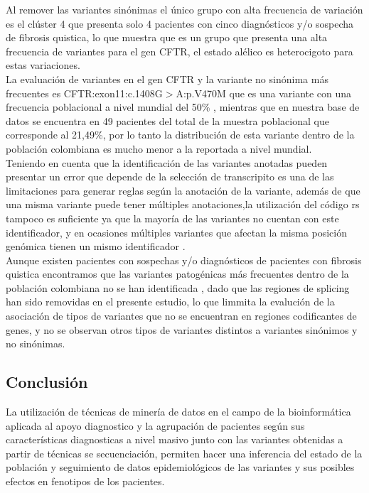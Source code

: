 Al remover las variantes sinónimas el único grupo con alta frecuencia de variación es el clúster 4 que presenta solo 4 pacientes con cinco diagnósticos y/o sospecha de fibrosis quistica, lo que muestra que es un grupo que presenta una alta frecuencia de variantes para el gen CFTR, el estado alélico es heterocigoto para estas variaciones.\\

La evaluación de variantes en el gen CFTR y la variante no sinónima más frecuentes es CFTR:exon11:c.1408G$>$A:p.V470M que es una variante con una frecuencia poblacional a nivel mundial del 50\% \cite{Zerbino2018}, mientras que en  nuestra base de datos se encuentra en 49 pacientes del total de la muestra poblacional que corresponde al 21,49\%, por lo tanto la distribución de esta variante dentro de la población colombiana es mucho menor a la reportada a nivel mundial.\\

Teniendo en cuenta que la identificación de las variantes anotadas pueden presentar un error que depende de la selección de transcripito es una de las limitaciones para generar reglas según la anotación de la variante, además de que una misma variante puede tener múltiples anotaciones,la utilización del código rs tampoco es suficiente ya que la mayoría de las variantes no cuentan con este identificador, y en ocasiones múltiples variantes que afectan la misma posición genómica tienen un mismo identificador \cite{Liu2016,McCarthy2014}. \\  

Aunque existen pacientes con sospechas y/o diagnósticos de pacientes con fibrosis quistica encontramos que las variantes patogénicas más frecuentes dentro de la población colombiana no se han identificada \cite{Vasquez2010}, dado que las regiones de splicing han sido removidas en el presente estudio, lo que limmita la evalución de la asociación de tipos de variantes que no se encuentran en regiones codificantes de genes, y no se observan otros tipos de variantes distintos a variantes sinónimos y no sinónimas. 

\subsection{Conclusión}

La utilización de técnicas de minería de datos en el campo de la bioinformática aplicada al apoyo diagnostico y  la agrupación de pacientes según sus características diagnosticas a nivel masivo junto con las variantes obtenidas a partir de técnicas se secuenciación, permiten hacer una inferencia del estado de la población y seguimiento de datos epidemiológicos de las variantes y sus posibles efectos en fenotipos de los pacientes.

